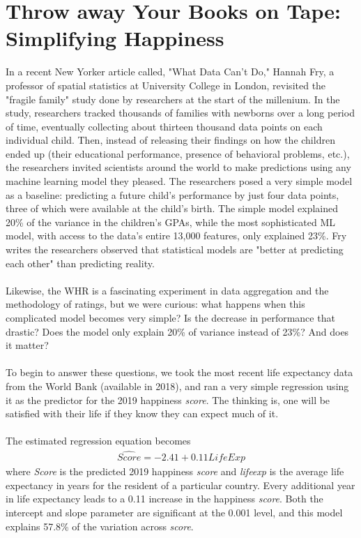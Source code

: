 \documentclass{article}
\begin{document}
\section{Throw away Your Books on Tape: Simplifying Happiness}
In a recent New Yorker article called, "What Data Can't Do," Hannah Fry, a professor of spatial statistics at University College in London, revisited the "fragile family" study done by researchers at the start of the millenium. In the study, researchers tracked thousands of families with newborns over a long period of time, eventually collecting about thirteen thousand data points on each individual child. Then, instead of releasing their findings on how the children ended up (their educational performance, presence of behavioral problems, etc.), the researchers invited scientists around the world to make predictions using any machine learning model they pleased. The researchers posed a very simple model as a baseline: predicting a future child's performance by just four data points, three of which were available at the child's birth. The simple model explained 20\% of the variance in the children's GPAs, while the most sophisticated ML model, with access to the data's entire 13,000 features, only explained 23\%. Fry writes the researchers observed that statistical models are "better at predicting each other" than predicting reality.\\\\
Likewise, the WHR is a fascinating experiment in data aggregation and the methodology of ratings, but we were curious: what happens when this complicated model becomes very simple? Is the decrease in performance that drastic? Does the model only explain 20\% of variance instead of 23\%? And does it matter?\\\\
To begin to answer these questions, we took the most recent life expectancy data from the World Bank (available in 2018), and ran a very simple regression using it as the predictor for the 2019 happiness \textit{score}. The thinking is, one will be satisfied with their life if they know they can expect much of it.\\\\
The estimated regression equation becomes
\begin{align*}
    \hat{Score} = -2.41 + 0.11LifeExp
\end{align*}
where \textit{Score} is the predicted 2019 happiness \textit{score} and \textit{lifeexp} is the average life expectancy in years for the resident of a particular country. Every additional year in life expectancy leads to a 0.11 increase in the happiness \textit{score}. Both the intercept and slope parameter are significant at the 0.001 level, and this model explains 57.8\% of the variation across \textit{score}. \\\\
\end{document}
